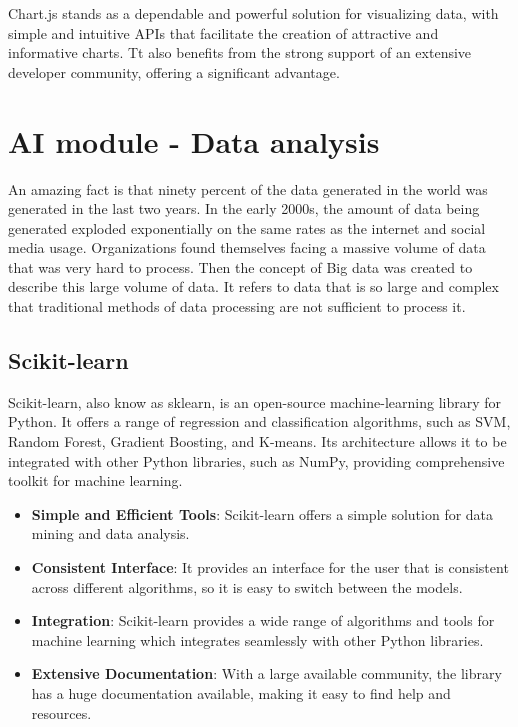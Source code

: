 Chart.js stands as a dependable and powerful solution for visualizing data, with simple and intuitive APIs that facilitate the creation of attractive and
informative charts. Tt also benefits from the strong support of an extensive developer community, offering a significant advantage.


\section{AI module - Data analysis}

An amazing fact is that ninety percent of the data generated in the world was generated in the last two years. In the early 2000s, the amount of data being
generated exploded exponentially on the same rates as the internet and social media usage. Organizations found themselves facing a massive volume of data 
that was very hard to process. Then the concept of Big data was created to describe this large volume of data. It refers to data that is so large and complex
that traditional methods of data processing are not sufficient to process it. \cite{bigdata}


\subsection{Scikit-learn}

Scikit-learn, also know as sklearn, is an open-source machine-learning library for Python. It offers a range of regression and classification algorithms,
such as SVM, Random Forest, Gradient Boosting, and K-means. Its architecture allows it to be integrated with other Python libraries, such as NumPy, providing 
comprehensive toolkit for machine learning. \cite{scikit}

\begin{itemize}
    \item \textbf{Simple and Efficient Tools}: Scikit-learn offers a simple solution for data mining and data analysis.
    \item \textbf{Consistent Interface}: It provides an interface for the user that is consistent across different algorithms, so it is easy to switch between the models.
    \item \textbf{Integration}: Scikit-learn provides a wide range of algorithms and tools for machine learning which integrates seamlessly with other Python libraries.
    \item \textbf{Extensive Documentation}: With a large available community, the library has a huge documentation available, making it easy to find help and resources.
\end{itemize}


